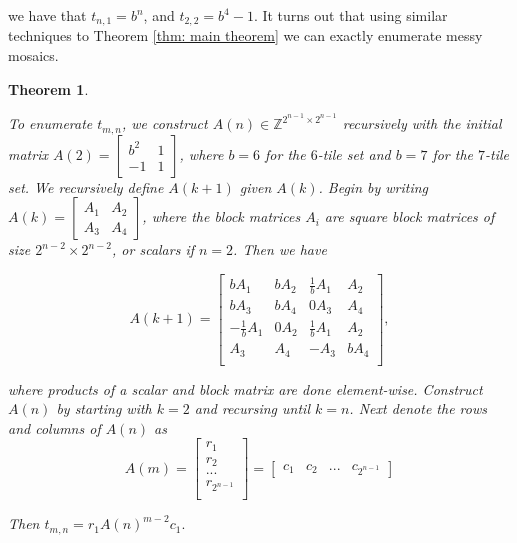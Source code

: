 \documentclass[12pt]{article}
\theoremstyle{plain}
\newtheorem{thm}{Theorem}
\theoremstyle{definition}
\theoremstyle{remark}
\theoremstyle{definition}
\newcommand{\cellA}[4]{ \draw[thick] ( #1 , #2 ) rectangle ( #3 , #4 ); \draw[red, thick, densely dotted] (#3 * 0.5 + #1 * 0.5 , #2) -- (#3, #4 * 0.5 + #2 * 0.5);}
\newcommand{\cellB}[4]{ \draw[thick] ( #1 , #2 ) rectangle ( #3 , #4 ); \draw[red, thick, densely dotted] (#3 * 0.5 + #1 * 0.5 , #2) -- (#1, #4 * 0.5 + #2 * 0.5);}
\newcommand{\cellC}[4]{ \draw[thick] ( #1 , #2 ) rectangle ( #3 , #4 ); \draw[red, thick, densely dotted] (#3 * 0.5 + #1 * 0.5 , #4) -- (#1, #4 * 0.5 + #2 * 0.5);}
\newcommand{\cellD}[4]{ \draw[thick] ( #1 , #2 ) rectangle ( #3 , #4 ); \draw[red, thick, densely dotted] (#3 * 0.5 + #1 * 0.5 , #4) -- (#3, #4 * 0.5 + #2 * 0.5);}
\begin{document}
\begin{center}
\end{center}

we have that $t_{n,1}=b^n$, and $t_{2,2} = b^4 - 1$. It turns out that using similar techniques to Theorem \ref{thm: main theorem} we can exactly enumerate messy mosaics. 

\begin{thm}
\label{thm: messy mosaics}

To enumerate $t_{m,n}$, we construct $A(n) \in \mathbb{Z}^{2^{n-1} \times 2^{n-1}}$ recursively with the initial matrix $
A(2) = \begin{bmatrix}
b^2 & 1 \\
-1 & 1
\end{bmatrix}
$, where $b = 6$ for the $6$-tile set and $b = 7$ for the $7$-tile set. We recursively define $A(k+1)$ given $A(k)$. Begin by writing
$
A(k) = \begin{bmatrix}
A_1 & A_2 \\
A_3 & A_4
\end{bmatrix}
$, where the block matrices $A_i$ are square block matrices of size $2^{n-2} \times 2^{n-2}$, or scalars if $n=2$. Then we have

$$
A(k+1) = \begin{bmatrix}
    bA_1 & bA_2 & \frac{1}{b}A_1 & A_2 \\
    bA_3 & bA_4 & 0A_3 & A_4 \\
    -\frac{1}{b}A_1 & 0A_2 & \frac{1}{b}A_1 & A_2 \\
    A_3 & A_4 & -A_3 & bA_4 \\
\end{bmatrix},
$$

where products of a scalar and block matrix are done element-wise. Construct $A(n)$ by starting with $k=2$ and recursing until $k=n$. Next denote the rows and columns of $A(n)$ as
$$
A(m) = 
\begin{bmatrix}
    r_1 \\
    r_2 \\
    ... \\
    r_{2^{n-1}} \\
\end{bmatrix} = 
\begin{bmatrix}
    c_1 & c_2 & ... & c_{2^{n-1}}
\end{bmatrix}
$$

Then $t_{m,n} = r_1 A(n)^{m-2}c_1 .$

\end{thm}
\end{document}
